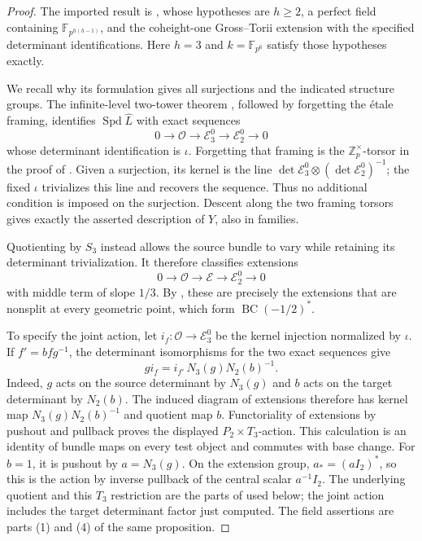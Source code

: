 \documentclass[11pt]{article}
\numberwithin{equation}{section}
\theoremstyle{definition}
\theoremstyle{remark}
\begin{document}
\begin{proof}
The imported result is \cite[Proposition 2.7.1(1)--(5)]{BMR2026}, whose
hypotheses are $h\ge2$, a perfect field containing
$\mathbb F_{p^{h(h-1)}}$, and the coheight-one Gross--Torii extension with the
specified determinant identifications.  Here $h=3$ and
$k=\mathbb F_{p^6}$ satisfy those hypotheses exactly.

We recall why its formulation gives all surjections and the indicated
structure groups.  The infinite-level two-tower theorem
\cite[Theorem 2.6.3]{BMR2026}, followed by forgetting the étale framing,
identifies $\operatorname{Spd}\widehat L$ with exact sequences
\[
 0\longrightarrow\mathcal O\longrightarrow\mathcal E_3^0
   \longrightarrow\mathcal E_2^0\longrightarrow0
\]
whose determinant identification is $\iota$.  Forgetting that framing is
the $\mathbb Z_p^{\times}$-torsor in the proof of
\cite[Proposition 2.7.1(2)]{BMR2026}.  Given a surjection, its kernel is
the line
$\det\mathcal E_3^0\otimes(\det\mathcal E_2^0)^{-1}$; the fixed
$\iota$ trivializes this line and recovers the sequence.  Thus no
additional condition is imposed on the surjection.  Descent along the
two framing torsors gives exactly the asserted description of $Y$, also
in families.

Quotienting by $S_3$ instead allows the source bundle to vary while
retaining its determinant trivialization.  It therefore classifies
extensions
\[
 0\longrightarrow\mathcal O\longrightarrow\mathcal E
   \longrightarrow\mathcal E_2^0\longrightarrow0
\]
with middle term of slope $1/3$.  By
\cite[Proposition 2.7.1(5)]{BMR2026}, these are precisely the extensions
that are nonsplit at every geometric point, which form
$\operatorname{BC}(-1/2)^*$.

To specify the joint action, let $i_f:\mathcal O\to\mathcal E_3^0$ be the
kernel injection normalized by $\iota$.  If $f'=bfg^{-1}$, the
determinant isomorphisms for the two exact sequences give
\[
 g i_f=i_{f'}\,N_3(g)N_2(b)^{-1}.
\]
Indeed, $g$ acts on the source determinant by $N_3(g)$ and $b$ acts on
the target determinant by $N_2(b)$.  The induced diagram of extensions
therefore has kernel map $N_3(g)N_2(b)^{-1}$ and quotient map $b$.
Functoriality of extensions by pushout and pullback proves the displayed
$P_2\times T_3$-action.  This calculation is an identity of bundle maps
on every test object and commutes with base change.  For $b=1$, it is
pushout by $a=N_3(g)$.  On the extension group, $a_*=(aI_2)^*$,
so this is the action by inverse pullback of the central scalar $a^{-1}I_2$.
The underlying quotient and this $T_3$ restriction
are the parts of \cite[Proposition 2.7.1(5)]{BMR2026} used below; the
joint action includes the target determinant factor just computed.
The field assertions are parts (1) and (4) of the same proposition.
\end{proof}
\end{document}
